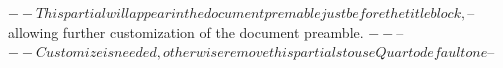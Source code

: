 $-- This partial will appear in the document premable just before the title block,
$-- allowing further customization of the document preamble.
$--
$-- %
$-- Customize is needed, otherwise remove this partials to use Quarto default one
$-- %

\usepackage{authblk}
\renewcommand\Affilfont{\small}

\usepackage{fancyhdr}
\pagestyle{fancy}

\fancyfoot[C]{}

\renewcommand{\footrulewidth}{0.4pt}

\renewcommand{\sectionmark}[1]{\markboth{\thesection\. \hspace{0.3cm} #1}{}}
\renewcommand{\subsectionmark}[1]{\markright{\thesubsection\. \hspace{0.3cm} #1}}

\fancyhead[L]{\rightmark}
\fancyhead[R]{\leftmark}
